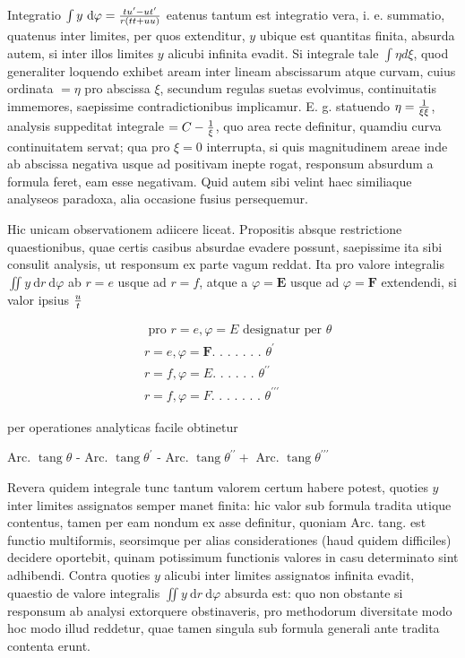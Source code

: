 \documentclass[twoside,12pt, showframe]{memoir}
\let\oldfrac\frac
\def\frac#1#2{\mathchoice{\tfrac{#1}{#2}}{\oldfrac{#1}{#2}}{\genfrac{}{}{}{2}{#1}{#2\mathstrut}}{\genfrac{}{}{}{3}{#1}{#2\mathstrut}}}
\begin{document}
Integratio \(\int y \mathrm{~d} \varphi=\frac{t u^{\prime}-u t^{\prime}}{r(t t+u u)}\) eatenus tantum est integratio vera, i. e. summatio, quatenus inter limites, per quos extenditur, \(y\) ubique est quantitas finita, absurda autem, si inter illos limites \(y\) alicubi infinita evadit. Si integrale tale \(\int \eta d \xi\), quod generaliter loquendo exhibet aream inter lineam abscissarum atque curvam, cuius ordinata \(=\eta\) pro abscissa \(\xi\), secundum regulas suetas evolvimus, continuitatis immemores, saepissime contradictionibus implicamur. E. g. statuendo \(\eta=\frac{1}{\xi \xi}\), analysis suppeditat integrale \(=C-\frac{1}{\xi}\), quo area recte definitur, quamdiu curva continuitatem servat; qua pro \(\xi=0\) interrupta, si quis magnitudinem areae inde ab abscissa negativa usque ad positivam inepte rogat, responsum absurdum a formula feret, eam esse negativam. Quid autem sibi velint haec similiaque analyseos paradoxa, alia occasione fusius persequemur.

Hic unicam observationem adiicere liceat. Propositis absque restrictione quaestionibus, quae certis casibus absurdae evadere possunt, saepissime ita sibi consulit analysis, ut responsum ex parte vagum reddat. Ita pro valore integralis \(\iint y \mathrm{~d} r \mathrm{~d} \varphi\) ab \(r=e\) usque ad \(r=f\), atque a \(\varphi=\boldsymbol{E}\) usque ad \(\varphi=\boldsymbol{F}\) extendendi, si valor ipsius \(\frac{u}{t}\)

\[
\begin{aligned}
& \text { pro } r=e, \varphi=E \text { designatur per } \theta \\
& r=e, \varphi=\boldsymbol{F} \text {. . . . . . . } \theta^{\prime} \\
& r=f, \varphi=E \text {. . . . . . } \theta^{\prime \prime} \\
& r=f, \varphi=F \text {. . . . . . . } \theta^{\prime \prime \prime}
\end{aligned}
\]

per operationes analyticas facile obtinetur

Arc. \(\operatorname{tang} \theta\) - Arc. \(\operatorname{tang} \theta^{\prime}\) - Arc. \(\operatorname{tang} \theta^{\prime \prime}+\) Arc. \(\operatorname{tang} \theta^{\prime \prime \prime}\)

Revera quidem integrale tunc tantum valorem certum habere potest, quoties \(y\) inter limites assignatos semper manet finita: hic valor sub formula tradita utique contentus, tamen per eam nondum ex asse definitur, quoniam Arc. tang. est functio multiformis, seorsimque per alias considerationes (haud quidem difficiles) decidere oportebit, quinam potissimum functionis valores in casu determinato sint adhibendi. Contra quoties \(y\) alicubi inter limites assignatos infinita evadit, quaestio de valore integralis \(\iint y \mathrm{~d} r \mathrm{~d} \varphi\) absurda est: quo non obstante si responsum ab analysi extorquere obstinaveris, pro methodorum diversitate modo hoc modo illud reddetur, quae tamen singula sub formula generali ante tradita contenta erunt.
\end{document}
